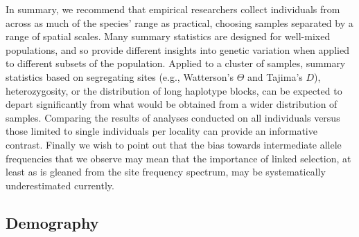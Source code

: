 \documentclass[10pt,twoside,lineno,hidelinks]{preprint}
\begin{document}
In summary, 
we recommend that empirical researchers collect individuals from across as much of the species' range as practical,
choosing samples separated by a range of spatial scales.
Many summary statistics are designed for well-mixed populations,
and so provide different insights into genetic variation
when applied to different subsets of the population.
Applied to a cluster of samples, summary statistics based on segregating sites 
(e.g., Watterson's $\Theta$ and Tajima's $D$), 
heterozygosity, or the distribution of long haplotype blocks, 
can be expected to depart significantly from what would be obtained from a wider distribution of samples.
Comparing the results of analyses conducted on all individuals versus those limited to single individuals per locality 
can provide an informative contrast. Finally we wish to point out that the bias towards intermediate allele frequencies that we observe may mean that the importance of linked selection, at least as is gleaned from the site frequency spectrum, may be systematically underestimated currently.

\subsection{Demography}
\end{document}
